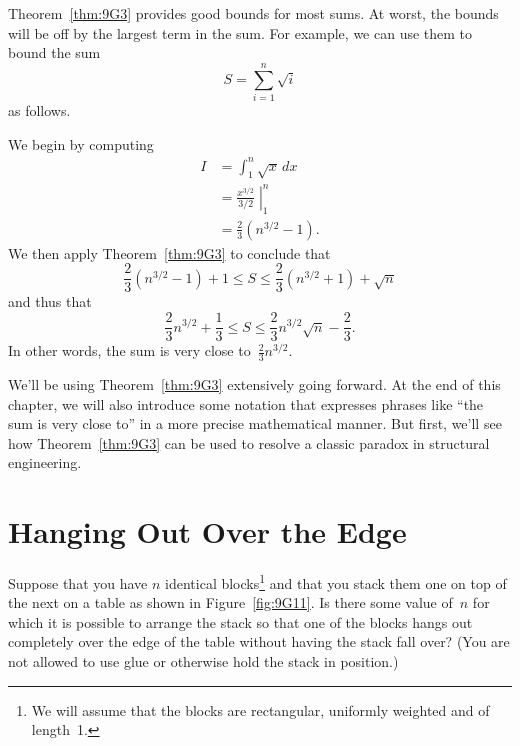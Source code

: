 Theorem~\ref{thm:9G3} provides good bounds for most sums.  At worst,
the bounds will be off by the largest term in the sum.  For example,
we can use them to bound the sum
\begin{equation*}
    S = \sum_{i = 1}^n \sqrt{i}
\end{equation*}
as follows.

We begin by computing
\begin{align*}
    I   &= \int_1^n \sqrt{x} \, dx \\
        &= \left. \frac{x^{3/2}}{3/2} \; \right|_1^n \\
        &= \frac{2}{3} (n^{3/2} - 1).
\end{align*}
We then apply Theorem~\ref{thm:9G3} to conclude that
\begin{equation*}
    \frac{2}{3} (n^{3/2} - 1) + 1
    \le S
    \le \frac{2}{3} (n^{3/2} + 1) + \sqrt{n}
\end{equation*}
and thus that
\begin{equation*}
    \frac{2}{3} n^{3/2} + \frac{1}{3}
    \le S
    \le \frac{2}{3} n^{3/2} \sqrt{n} - \frac{2}{3}.
\end{equation*}
In other words, the sum is very close to~$\frac{2}{3} n^{3/2}$.

We'll be using Theorem~\ref{thm:9G3} extensively going forward.  At
the end of this chapter, we will also introduce some notation that
expresses phrases like ``the sum is very close to'' in a more precise
mathematical manner.  But first, we'll see how Theorem~\ref{thm:9G3}
can be used to resolve a classic paradox in structural engineering.

\begin{problems}

\classproblems
{}

\homeworkproblems
{}

\end{problems}


\section{Hanging Out Over the Edge}\label{book_stacking_sec}

Suppose that you have $n$ identical blocks\footnote{We will assume
  that the blocks are rectangular, uniformly weighted and of
  length~1.}  and that you stack them one on top of the next on a
table as shown in Figure~\ref{fig:9G11}.  Is there some value of~$n$
for which it is possible to arrange the stack so that one of the
blocks hangs out completely over the edge of the table without having
the stack fall over?  (You are not allowed to use glue or otherwise
hold the stack in position.)

